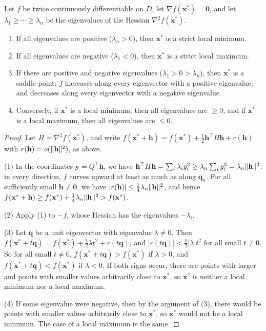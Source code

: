 \begin{theorem}\label{L3-thm:second-order}
    Let $f$ be twice continuously differentiable on $D$, let $\nabla f(\mathbf{x}^*) = \mathbf{0}$, and let $\lambda_1 \geq \cdots \geq \lambda_n$ be the eigenvalues of the Hessian $\nabla^2 f(\mathbf{x}^*)$.
    \begin{enumerate}
        \item If all eigenvalues are positive ($\lambda_n > 0$), then $\mathbf{x}^*$ is a strict local minimum.
        \item If all eigenvalues are negative ($\lambda_1 < 0$), then $\mathbf{x}^*$ is a strict local maximum.
        \item If there are positive and negative eigenvalues ($\lambda_1 > 0 > \lambda_n$), then $\mathbf{x}^*$ is a saddle point: $f$ increases along every eigenvector with a positive eigenvalue, and decreases along every eigenvector with a negative eigenvalue.
        \item Conversely, if $\mathbf{x}^*$ is a local minimum, then all eigenvalues are $\geq 0$, and if $\mathbf{x}^*$ is a local maximum, then all eigenvalues are $\leq 0$.
    \end{enumerate}
\end{theorem}

\begin{proof}
    Let $H = \nabla^2 f(\mathbf{x}^*)$, and write $f(\mathbf{x}^* + \mathbf{h}) = f(\mathbf{x}^*) + \frac{1}{2}\mathbf{h}^\top H\mathbf{h} + r(\mathbf{h})$ with $r(\mathbf{h}) = o(\lVert \mathbf{h} \rVert^2)$, as above.

    (1) In the coordinates $\mathbf{y} = Q^\top\mathbf{h}$, we have $\mathbf{h}^\top H\mathbf{h} = \sum_i \lambda_i y_i^2 \geq \lambda_n \sum_i y_i^2 = \lambda_n\lVert \mathbf{h} \rVert^2$: in every direction, $f$ curves upward at least as much as along $\mathbf{q}_n$. For all sufficiently small $\mathbf{h} \neq \mathbf{0}$, we have $|r(\mathbf{h})| \leq \frac{1}{4}\lambda_n\lVert \mathbf{h} \rVert^2$, and hence $f(\mathbf{x}^* + \mathbf{h}) \geq f(\mathbf{x}^*) + \frac{1}{4}\lambda_n\lVert \mathbf{h} \rVert^2 > f(\mathbf{x}^*)$.

    (2) Apply (1) to $-f$, whose Hessian has the eigenvalues $-\lambda_i$.

    (3) Let $\mathbf{q}$ be a unit eigenvector with eigenvalue $\lambda \neq 0$. Then $f(\mathbf{x}^* + t\mathbf{q}) = f(\mathbf{x}^*) + \frac{1}{2}\lambda t^2 + r(t\mathbf{q})$, and $|r(t\mathbf{q})| < \frac{1}{2}|\lambda| t^2$ for all small $t \neq 0$. So for all small $t \neq 0$, $f(\mathbf{x}^* + t\mathbf{q}) > f(\mathbf{x}^*)$ if $\lambda > 0$, and $f(\mathbf{x}^* + t\mathbf{q}) < f(\mathbf{x}^*)$ if $\lambda < 0$. If both signs occur, there are points with larger and points with smaller values arbitrarily close to $\mathbf{x}^*$, so $\mathbf{x}^*$ is neither a local minimum nor a local maximum.

    (4) If some eigenvalue were negative, then by the argument of (3), there would be points with smaller values arbitrarily close to $\mathbf{x}^*$, so $\mathbf{x}^*$ would not be a local minimum. The case of a local maximum is the same.
\end{proof}

